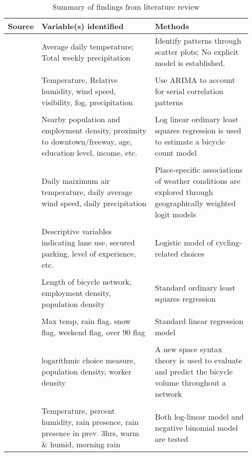 \documentclass[12pt,letterpaper,article]{memoir}
\begin{document}
\begin{table}[htdp]
\begin{center}
\begin{scriptsize}
\caption{Summary of findings from literature review}
\begin{tabularx}{1.0\textwidth}{>{\raggedright\arraybackslash}p{2.7cm}>{\raggedright\arraybackslash}X>{\raggedright\arraybackslash}X}
  \toprule
  Source & Variable(s) identified & Methods \\
  \midrule
  \cite{Fields:2012aa} & Average daily temperature; Total weekly precipitation & Identify patterns through scatter plots; No explicit model is established. \\
\\
  \cite{Gallop:2012aa} & Temperature, Relative humidity, wind speed, visibility, fog, precipitation & Use ARIMA to account for serial correlation patterns \\
\\
  \cite{Griswold:2011aa} & Nearby population and employment density, proximity to downtown/freeway, age, education level, income, etc. & Log linear ordinary least squares regression is used to estimate a bicycle count model \\
\\
  \cite{Helbich:2014aa} & Daily maiximum air temperature, daily average wind speed, daily precipitation & Place-specific associations of weather conditions are explored through geographically weighted logit models \\
\\
  \cite{Hunt:2007aa} & Descriptive variables indicating lane use, secured parking, level of experience, etc. & Logistic model of cycling-related choices \\
\\
  \cite{Jones:2010aa} & Length of bicycle network, employment density, population density & Standard ordinary least squares regression \\
\\
  \cite{Lewin:2011aa} & Max temp, rain flag, snow flag, weekend flag, over 90 flag & Standard linear regression model \\
\\
  \cite{McCahil:2008aa} & logarithmic choice measure, population density, worker density & A new space syntax theory is used to evaluate and predict the bicycle volume throughout a network \\
\\
  \cite{Miranda-Moreno:2011aa} & Temperature, percent humidity, rain presence, rain presence in prev. 3hrs, warm \& humid, morning rain & Both log-linear model and negative binomial model are tested \\

\end{tabularx}
\end{scriptsize}
\end{center}
\end{table}
\end{document}
